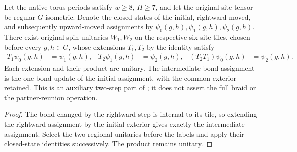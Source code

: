 \begin{lemma}
    \label{thm:peps_two_step_string_physical_route}
    \leanok
    Let the native torus periods satisfy $w\ge8$, $H\ge7$, and let the
    original site tensor be regular $G$-isometric. Denote the closed
    states of the initial, rightward-moved, and subsequently upward-moved
    assignments by $\psi_0(g,h),\psi_1(g,h),\psi_2(g,h)$.
    There exist original-spin unitaries $W_1,W_2$ on the respective six-site
    tiles, chosen before every $g,h\in G$, whose extensions $T_1,T_2$ by the
    identity satisfy
    \begin{align}
        T_1\psi_0(g,h)      & =\psi_1(g,h), &
        T_2\psi_1(g,h)      & =\psi_2(g,h), &
        (T_2T_1)\psi_0(g,h) & =\psi_2(g,h).
    \end{align}
    Each extension and their product are unitary. The intermediate bond
    assignment is the one-bond update of the initial assignment, with
    the common exterior retained. This is an auxiliary two-step part of
    \cite[Section~6.6]{Schuch2010PEPS}; it does not assert the full braid or
    the partner-reunion operation.
\end{lemma}
\begin{proof}
    \leanok
    The bond changed by the rightward step is internal to its tile, so
    extending the rightward assignment by the initial exterior gives exactly
    the intermediate assignment. Select the two regional unitaries
    before the labels and apply their closed-state identities successively.
    The product remains unitary.
\end{proof}
